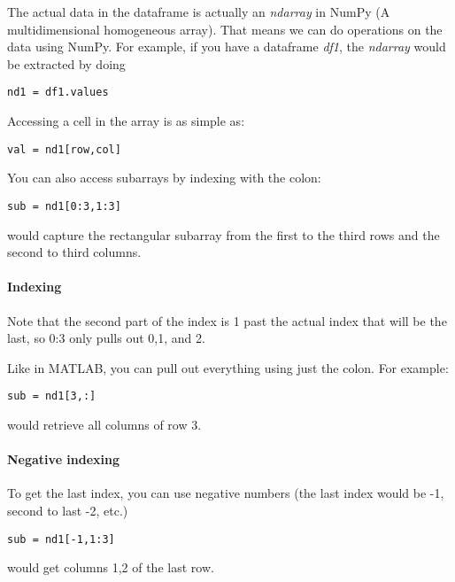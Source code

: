 \noindent The actual data in the dataframe is actually an \textit{ndarray} in NumPy (A multidimensional homogeneous array). That means we can do operations on the data using NumPy. For example, if you have a dataframe \textit{df1}, the \textit{ndarray} would be extracted by doing

\begin{lstlisting}[style=python]
nd1 = df1.values
\end{lstlisting}

\noindent Accessing a cell in the array is as simple as:

\begin{lstlisting}[style=python]
val = nd1[row,col]
\end{lstlisting}

\noindent You can also access subarrays by indexing with the colon:

\begin{lstlisting}[style=python]
sub = nd1[0:3,1:3]
\end{lstlisting}

\noindent would capture the rectangular subarray from the first to the third rows and the second to third columns.

\paragraph{Indexing} Note that the second part of the index is 1 past the actual index that will be the last, so 0:3 only pulls out 0,1, and 2.

\noindent Like in MATLAB, you can pull out everything using just the colon. For example:

\begin{lstlisting}[style=python]
sub = nd1[3,:]
\end{lstlisting}

\noindent would retrieve all columns of row 3.

\paragraph{Negative indexing} To get the last index, you can use negative numbers (the last index would be -1, second to last -2, etc.)

\begin{lstlisting}[style=python]
sub = nd1[-1,1:3]
\end{lstlisting}

\noindent would get columns 1,2 of the last row.

